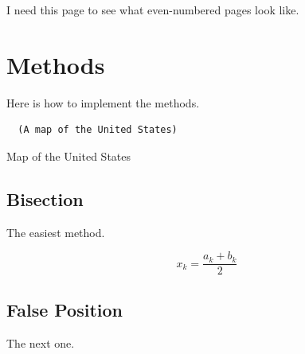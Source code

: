 \documentclass[thesis]{./tex/thesis-umich}
\begin{document}
\newpage

I need this page to see what even-numbered pages look like.

\appendix
\chapter{Methods}
Here is how to implement the methods.

\begin{program}
 \begin{verbatim}
  (A map of the United States)
 \end{verbatim}
 \caption{Map of the United States}
\end{program}

\section{Bisection}
The easiest method.

\begin{equation}
x_k = \frac{a_k+b_k}{2}
\end{equation}

\section{False Position}
The next one.



\end{document}
